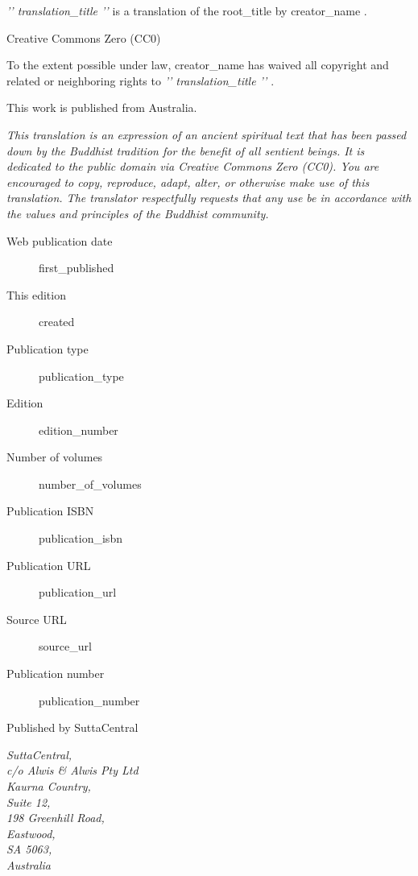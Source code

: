 
\begin{footnotesize}

\textit{{ '{' }}{{ translation_title }}{{ '}' }} is a translation of the {{ root_title }} by {{ creator_name }}.

\medskip

Creative Commons Zero (CC0)

To the extent possible under law, {{ creator_name }} has waived all copyright and related or neighboring rights to \textit{{ '{' }}{{ translation_title }}{{ '}' }}.

\medskip

This work is published from Australia.

\begin{center}
\textit{This translation is an expression of an ancient spiritual text that has been passed down by the Buddhist tradition for the benefit of all sentient beings. It is dedicated to the public domain via Creative Commons Zero (CC0). You are encouraged to copy, reproduce, adapt, alter, or otherwise make use of this translation. The translator respectfully requests that any use be in accordance with the values and principles of the Buddhist community.}
\end{center}

\medskip

\begin{description}
\item[Web publication date] {{ first_published }}
\item[This edition] {{ created }}
\item[Publication type] {{ publication_type }}
\item[Edition] {{ edition_number }}
\item[Number of volumes] {{ number_of_volumes }}
\item[Publication ISBN] {{ publication_isbn }}
\item[Publication URL] {{ publication_url }}
\item[Source URL] {{ source_url }}
\item[Publication number] {{ publication_number }}
\end{description}

\medskip

Published by SuttaCentral

\medskip

\textit{SuttaCentral,\\
c/o Alwis & Alwis Pty Ltd\\
Kaurna Country,\\
Suite 12,\\
198 Greenhill Road,\\
Eastwood,\\
SA 5063,\\
Australia}

\end{footnotesize}

\newpage
